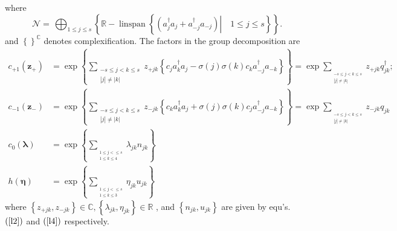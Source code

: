 \documentclass[aps,preprint]{revtex4}%
\begin{document}
where
\begin{equation}
\mathcal{N=\,}%
{\textstyle\bigoplus_{1\leq j\leq s}}
\left\{  \mathbb{R-}\operatorname{linspan}\left\{  \left.  \left(
a_{j}^{\dagger}a_{j}+a_{-j}^{\dagger}a_{-j}\right)  \right\vert \quad1\leq
j\leq s\right\}  \right\}  .
\end{equation}
and $\left\{  {}\right\}  ^{\mathbb{C}}$ denotes complexification. The factors
in the group decomposition are%
\begin{align}
c_{+1}\left(  \mathbf{z}_{+}\right)   &  =\exp\left\{  \sum
\limits_{\substack{-s\leq j<k\leq s\\\left\vert j\right\vert \neq\left\vert
k\right\vert }}z_{+jk}\left\{  c_{j}a_{k}^{\dagger}a_{j}-\sigma\left(
j\right)  \sigma\left(  k\right)  c_{k}a_{-j}^{\dagger}a_{-k}\right\}
\right\}  =\exp\sum\limits_{_{\substack{-s\leq j<k\leq s\\\left\vert
j\right\vert \neq\left\vert k\right\vert }}}z_{+jk}q_{jk}^{\dagger
};\label{co1}\\
c_{-1}\left(  \mathbf{z}_{-}\right)   &  =\exp\left\{  \sum
\limits_{\substack{-s\leq j<k\leq s\\\left\vert j\right\vert \neq\left\vert
k\right\vert }}z_{-jk}\left\{  c_{k}a_{k}^{\dagger}a_{j}+\sigma\left(
j\right)  \sigma\left(  k\right)  c_{j}a_{-j}^{\dagger}a_{-k}\right\}
\right\}  =\exp\sum\limits_{_{\substack{-s\leq j<k\leq s\\\left\vert
j\right\vert \neq\left\vert k\right\vert }}}z_{-jk}q_{jk}\label{co2}\\
c_{0}\left(  \mathbf{\lambda}\right)   &  =\exp\left\{  \sum
\limits_{_{\substack{1\leq j<\leq s\\1\leq k\leq4}}}\lambda_{jk}n_{jk}\right\}
\label{co3}\\
h\left(  \mathbf{\eta}\right)   &  =\exp\left\{  \sum
\limits_{_{\substack{1\leq j<\leq s\\1\leq k\leq3}}}\eta_{jk}u_{jk}\right\}
\label{co4}%
\end{align}
where $\left\{  z_{+jk},z_{-jk}\right\}  \in\mathbb{C},\left\{  \lambda
_{jk},\eta_{jk}\right\}  \in\mathbb{R}$ , and $\left\{  n_{jk},u_{jk}\right\}
$ are given by equ's. $\left(  \ref{l2}\right)  $ and $\left(  \ref{l4}%
\right)  $ respectively.
\end{document}
